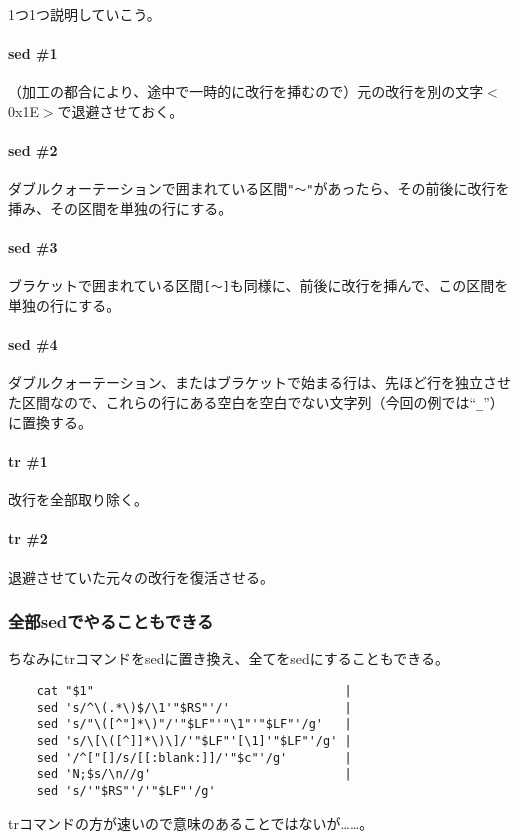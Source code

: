 1つ1つ説明していこう。

\paragraph{sed \#1}
（加工の都合により、途中で一時的に改行を挿むので）元の改行を別の文字$<$0x1E$>$で退避させておく。

\paragraph{sed \#2}
ダブルクォーテーションで囲まれている区間\verb|"～"|があったら、その前後に改行を挿み、その区間を単独の行にする。

\paragraph{sed \#3}
ブラケットで囲まれている区間\verb|[～]|も同様に、前後に改行を挿んで、この区間を単独の行にする。

\paragraph{sed \#4}
ダブルクォーテーション、またはブラケットで始まる行は、先ほど行を独立させた区間なので、これらの行にある空白を空白でない文字列（今回の例では``\verb|_|''）に置換する。

\paragraph{tr \#1}
改行を全部取り除く。

\paragraph{tr \#2}
退避させていた元々の改行を復活させる。

\subsubsection*{全部sedでやることもできる}

ちなみにtrコマンドをsedに置き換え、全てをsedにすることもできる。\\
\begin{frameboxit}{160.0mm}
\begin{verbatim}
	cat "$1"                                   |
	sed 's/^\(.*\)$/\1'"$RS"'/'                |
	sed 's/"\([^"]*\)"/'"$LF"'"\1"'"$LF"'/g'   |
	sed 's/\[\([^]]*\)\]/'"$LF"'[\1]'"$LF"'/g' |
	sed '/^["[]/s/[[:blank:]]/'"$c"'/g'        |
	sed 'N;$s/\n//g'                           |
	sed 's/'"$RS"'/'"$LF"'/g'
\end{verbatim}
\end{frameboxit}
trコマンドの方が速いので意味のあることではないが……。

